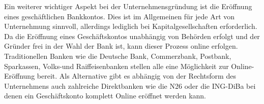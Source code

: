 Ein weiterer wichtiger Aspekt bei der Unternehmensgründung ist die Eröffnung eines geschäftlichen Bankkontos. Dies ist im Allgemeinen für jede Art von Unternehmung sinnvoll, allerdings lediglich bei Kapitalgesellschaften erforderlich.
Da die Eröffnung eines Geschäftskontos unabhängig von Behörden erfolgt und der Gründer frei in der Wahl der Bank ist, kann dieser Prozess online erfolgen. Traditionellen Banken wie die Deutsche Bank, Commerzbank, Postbank, Sparkassen, Volks-und Raiffeisenbanken stellen alle eine Möglichkeit zur Online-Eröffnung bereit. Als Alternative gibt es abhängig von der Rechtsform des Unternehmens auch zahlreiche Direktbanken wie die N26 oder die ING-DiBa bei denen ein Geschäftskonto komplett Online eröffnet werden kann.
